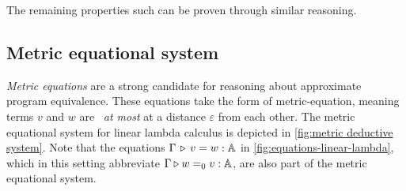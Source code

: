 The remaining properties such can be proven through similar reasoning. 


\subsection{Metric equational system}

\emph{Metric equations} \cite{mardare2016quantitative,mardare2017axiomatizability} are a strong candidate for reasoning about approximate program equivalence. These equations take the form of \gls{metric-equation}, meaning  terms $v$ and $w$ are  \emph{at most} at a distance $\varepsilon$ from each other. The metric equational system for linear lambda calculus is depicted in \autoref{fig:metric deductive system}. 
Note that the equations $\Gamma \, \triangleright \, v = w : \mathbb{A}$ in \autoref{fig:equations-linear-lambda}, which in this setting abbreviate $\Gamma \triangleright w =_0 v : \mathbb{A}$, are also part of the metric equational system.


